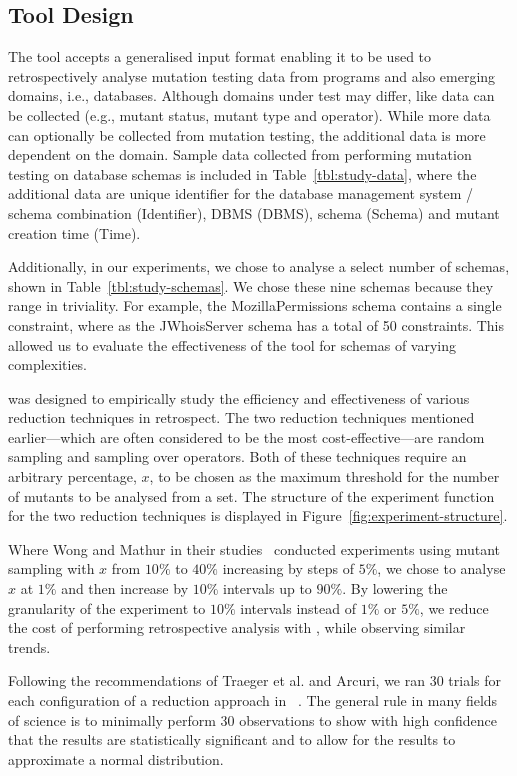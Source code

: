 \subsection{Tool Design}

The \mr tool accepts a generalised input format enabling it to be used to retrospectively analyse mutation testing
data from programs and also emerging domains, i.e., databases. Although domains under test may differ,
like data can be collected (e.g., mutant status, mutant type and operator). While more data
can optionally be collected from mutation testing, the additional data is more
dependent on the domain. Sample data collected from performing mutation testing on database schemas
is included in Table~\ref{tbl:study-data}, where the additional data are
unique identifier for the database management system / schema combination (Identifier),
DBMS (DBMS), schema (Schema) and mutant creation time (Time).

Additionally, in our experiments, we chose to analyse a select number of schemas, shown in Table~\ref{tbl:study-schemas}.
We chose these nine schemas because they range in triviality. For example, the MozillaPermissions schema contains
a single constraint, where as the JWhoisServer schema has a total of 50 constraints. This allowed us to evaluate the effectiveness
of the \mr tool for schemas of varying complexities.

\mr was designed to empirically study the efficiency and effectiveness of
various reduction techniques in retrospect. The two reduction techniques mentioned earlier---which are often considered
to be the most cost-effective---are random sampling and sampling over operators. Both
of these techniques require an arbitrary percentage, $x$, to be chosen as the maximum threshold
for the number of mutants to be analysed from a set. The structure of the experiment function for the two
reduction techniques is displayed in Figure~\ref{fig:experiment-structure}.

Where Wong and Mathur in their studies~\cite{mathur1994empirical, wong1993mutation} conducted
experiments using mutant sampling with $x$ from $10\%$ to $40\%$ increasing by steps of $5\%$, we
chose to analyse $x$ at $1\%$ and then increase by $10\%$ intervals up to $90\%$. By lowering
the granularity of the experiment to $10\%$ intervals instead of
$1\%$ or $5\%$, we reduce the cost of performing retrospective analysis with \mr, while observing
similar trends.

Following the recommendations of Traeger et al. and Arcuri, we ran 30 trials for each configuration
of a reduction approach in \mr~\cite{traeger2008nine, arcuri2014hitchhiker}.
The general rule in many fields of science is to minimally perform 30 observations to show with high confidence
that the results are statistically significant and to allow for the results to approximate a normal distribution.
